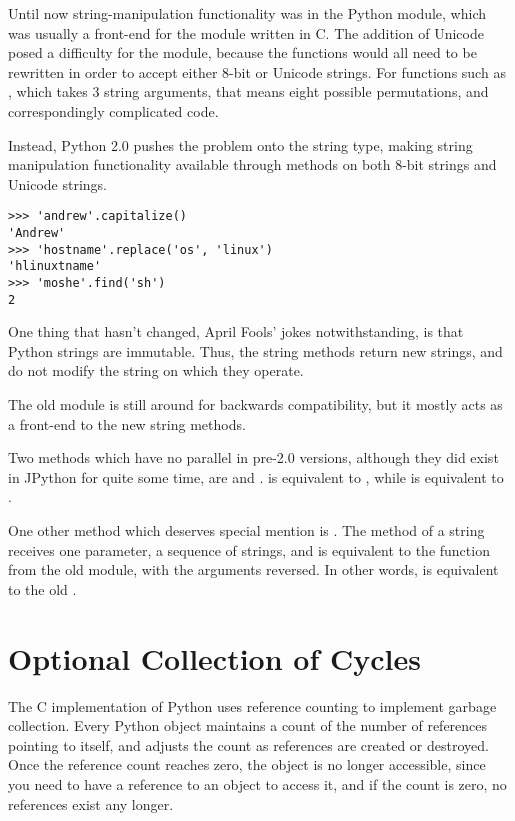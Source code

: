 \documentclass{howto}
\begin{document}
Until now string-manipulation functionality was in the 
Python module, which was usually a front-end for the 
module written in C.  The addition of Unicode posed a difficulty for
the  module, because the functions would all need to be
rewritten in order to accept either 8-bit or Unicode strings.  For
functions such as , which takes 3 string
arguments, that means eight possible permutations, and correspondingly
complicated code.

Instead, Python 2.0 pushes the problem onto the string type, making
string manipulation functionality available through methods on both
8-bit strings and Unicode strings.  

\begin{verbatim}
>>> 'andrew'.capitalize()
'Andrew'
>>> 'hostname'.replace('os', 'linux')
'hlinuxtname'
>>> 'moshe'.find('sh')
2
\end{verbatim}

One thing that hasn't changed, April Fools' jokes notwithstanding, is
that Python strings are immutable. Thus, the string methods return new
strings, and do not modify the string on which they operate.

The old  module is still around for backwards
compatibility, but it mostly acts as a front-end to the new string
methods.

Two methods which have no parallel in pre-2.0 versions, although they
did exist in JPython for quite some time, are 
and .   is equivalent to , while  is equivalent to .

One other method which deserves special mention is .  The
 method of a string receives one parameter, a sequence of
strings, and is equivalent to the  function from
the old  module, with the arguments reversed. In other
words,  is equivalent to the old
.

\section{Optional Collection of Cycles}

The C implementation of Python uses reference counting to implement
garbage collection.  Every Python object maintains a count of the
number of references pointing to itself, and adjusts the count as
references are created or destroyed.  Once the reference count reaches
zero, the object is no longer accessible, since you need to have a
reference to an object to access it, and if the count is zero, no
references exist any longer.  
\end{document}
